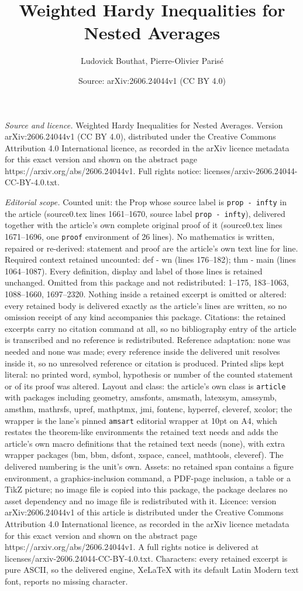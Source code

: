 \documentclass[10pt,a4paper]{amsart}
\title[Weighted Hardy Inequalities for Nested Averages]{Weighted Hardy Inequalities for Nested Averages}
\author{Ludovick Bouthat, Pierre-Olivier Paris\'e}
\date{Source: arXiv:2606.24044v1 (CC BY 4.0)}
\begin{document}
\maketitle

\noindent\emph{Source and licence.} Weighted Hardy Inequalities for Nested Averages. Version arXiv:2606.24044v1 (CC BY 4.0), distributed under the Creative Commons Attribution 4.0 International licence, as recorded in the arXiv licence metadata for this exact version and shown on the abstract page https://arxiv.org/abs/2606.24044v1. Full rights notice: licenses/arxiv-2606.24044-CC-BY-4.0.txt.\par\smallskip

\noindent\textit{Editorial scope.} Counted unit: the Prop whose source label is \texttt{prop - infty} in the article (source0.tex lines 1661--1670, source label \texttt{prop - infty}), delivered together with the article's own complete original proof of it (source0.tex lines 1671--1696, one \texttt{proof} environment of 26 lines). No mathematics is written, repaired or re-derived: statement and proof are the article's own text line for line. Required context retained uncounted: def - wn (lines 176--182); thm - main (lines 1064--1087). Every definition, display and label of those lines is retained unchanged. Omitted from this package and not redistributed: 1--175, 183--1063, 1088--1660, 1697--2320. Nothing inside a retained excerpt is omitted or altered: every retained body is delivered exactly as the article's lines are written, so no omission receipt of any kind accompanies this package. Citations: the retained excerpts carry no citation command at all, so no bibliography entry of the article is transcribed and no reference is redistributed. Reference adaptation: none was needed and none was made; every reference inside the delivered unit resolves inside it, so no unresolved reference or citation is produced. Printed slips kept literal: no printed word, symbol, hypothesis or number of the counted statement or of its proof was altered. Layout and class: the article's own class is \texttt{article} with packages including geometry, amsfonts, amsmath, latexsym, amssymb, amsthm, mathrsfs, upref, mathptmx, jmi, fontenc, hyperref, cleveref, xcolor; the wrapper is the lane's pinned \texttt{amsart} editorial wrapper at 10pt on A4, which restates the theorem-like environments the retained text needs and adds the article's own macro definitions that the retained text needs (none), with extra wrapper packages (bm, bbm, dsfont, xspace, cancel, mathtools, cleveref). The delivered numbering is the unit's own. Assets: no retained span contains a figure environment, a graphics-inclusion command, a PDF-page inclusion, a table or a TikZ picture; no image file is copied into this package, the package declares no asset dependency and no image file is redistributed with it. Licence: version arXiv:2606.24044v1 of this article is distributed under the Creative Commons Attribution 4.0 International licence, as recorded in the arXiv licence metadata for this exact version and shown on the abstract page https://arxiv.org/abs/2606.24044v1. A full rights notice is delivered at licenses/arxiv-2606.24044-CC-BY-4.0.txt. Characters: every retained excerpt is pure ASCII, so the delivered engine, XeLaTeX with its default Latin Modern text font, reports no missing character.
\end{document}
